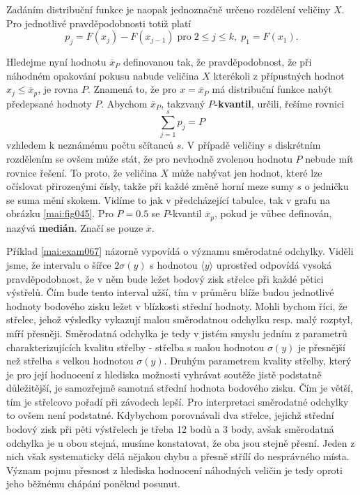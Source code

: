     Zadáním distribuční funkce je naopak jednoznačně určeno rozdělení veličiny \(X\). Pro jednotlivé
    pravděpodobnosti totiž platí
    \begin{equation*}
      p_j = F(x_j) - F(x_{j-1})\;\text{pro}\; 2\leq j \leq k, \; p_1 = F(x_1).
    \end{equation*}
    
    Hledejme nyní hodnotu \(\overline{x}_P\) definovanou tak, že pravděpodobnost, že při náhodném 
    opakování pokusu nabude veličina \(X\) kterékoli z přípustných hodnot \(x_j \leq 
    \overline{x}_p\), je rovna \(P\). Znamená to, že pro \(x = \overline{x}_P\) má distribuční 
    funkce nabýt předepsané hodnoty \(P\). Abychom \(\overline{x}_P\), takzvaný 
    \(P\)\textbf{-kvantil}, určili, řešíme rovnici
    \begin{equation}\label{mai:eq064}
      \sum_{j=1}^{s}p_j = P
    \end{equation}
    vzhledem k neznámému počtu sčítanců \(s\). V případě veličiny s diskrétním rozdělením se ovšem
    může stát, že pro nevhodně zvolenou hodnotu \(P\) nebude mít rovnice řešení. To proto, že 
    veličina \(X\) může nabývat jen hodnot, které lze očíslovat přirozenými čísly, takže při každé 
    změně horní meze sumy \(s\) o jedničku se suma mění skokem. Vidíme to jak v předcházející 
    tabulce, tak v grafu na obrázku \ref{mai:fig045}. Pro \(P = \num{0.5}\) se \(P\)-kvantil 
    \(\overline{x}_p\), pokud je vůbec definován, nazývá \textbf{medián}. Značí se pouze 
    \(\overline{x}\).

    
    
    Příklad \ref{mai:exam067} názorně vypovídá o významu směrodatné odchylky. Viděli jsme, že 
    intervalu o šířce \(2\sigma(y)\) s hodnotou \(\langle y \rangle\) uprostřed odpovídá vysoká 
    pravděpodobnost, že v něm bude ležet bodový zisk střelce při každé pětici výstřelů. Čím bude 
    tento interval užší, tím v průměru blíže budou jednotlivé hodnoty bodového zisku ležet v 
    blízkosti střední hodnoty. Mohli bychom říci, že střelec, jehož výsledky vykazují malou 
    směrodatnou odchylku resp. malý rozptyl, míří přesněji. Směrodatná odchylka je tedy v jistém 
    smyslu jedním z parametrů charakterizujících kvalitu střelby - střelba s malou hodnotou  
    \(\sigma(y)\) je přesnější než střelba s velkou hodnotou \(\sigma(y)\). Druhým parametrem 
    kvality střelby, který je pro její hodnocení z hlediska možnosti vyhrávat soutěže jistě 
    podstatně důležitější, je samozřejmě samotná střední hodnota bodového zisku. Čím je větší, tím 
    je střelcovo pořadí při závodech lepší. Pro interpretaci směrodatné odchylky to ovšem není 
    podstatné. Kdybychom porovnávali dva střelce, jejichž střední bodový zisk při
    pěti výstřelech je třeba \num{12} bodů a \num{3} body, avšak směrodatná odchylka je u obou 
    stejná, musíme konstatovat, že oba jsou stejně přesní. Jeden z nich však systematicky dělá 
    nějakou chybu a přesně střílí do nesprávného místa. Význam pojmu přesnost z hlediska hodnocení 
    náhodných veličin je tedy oproti jeho běžnému chápání poněkud posunut.
    
